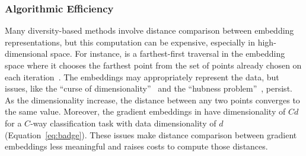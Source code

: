 \subsubsection{Algorithmic Efficiency}
Many diversity-based methods involve distance comparison between embedding
representations, but this computation can be expensive, especially in
high-dimensional space.
For instance, \coreset{} is a
farthest-first traversal in the embedding space where it chooses the farthest point
from the set of points already chosen on each iteration~\citep{sener-2018}.
The embeddings may appropriately represent the data, but issues, like the ``curse of
dimensionality''~\citep{beyer-1999} and the ``hubness
problem''~\citep{tomasev-2013}, persist.  As the dimensionality increase, the
distance between any two points converges to the same value.
Moreover, the gradient embeddings in \badge{} have dimensionality of $Cd$ for a
$C$-way classification task with data dimensionality of $d$
(Equation~\ref{eq:badge}).
These issues make distance comparison between gradient embeddings less meaningful and
raises costs to compute those distances.


